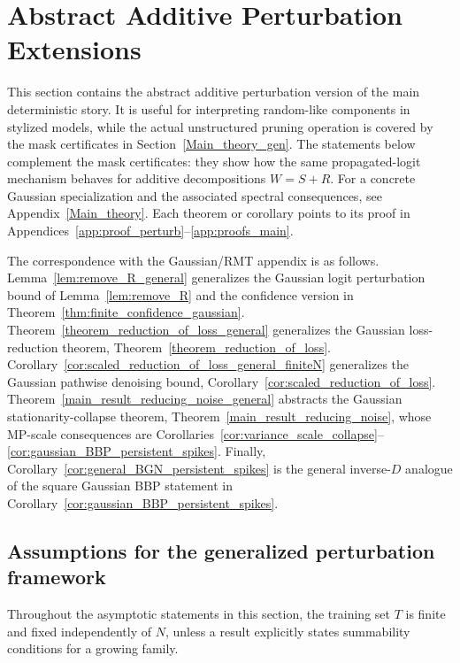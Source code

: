 \documentclass[11pt]{article}
\theoremstyle{plain}
\theoremstyle{definition}
\theoremstyle{remark}
\newcommand{\1}{\mathbf{1}}
\begin{document}
\section{Abstract Additive Perturbation Extensions}
\label{sec:abstract_additive_extensions}

This section contains the abstract additive perturbation version of the main deterministic story.  It is useful for interpreting random-like components in stylized models, while the actual unstructured pruning operation is covered by the mask certificates in Section~\ref{Main_theory_gen}.  The statements below complement the mask certificates: they show how the same propagated-logit mechanism behaves for additive decompositions \(W=S+R\).  For a concrete Gaussian specialization and the associated spectral consequences, see Appendix~\ref{Main_theory}.  Each theorem or corollary points to its proof in Appendices~\ref{app:proof_perturb}--\ref{app:proofs_main}.

The correspondence with the Gaussian/RMT appendix is as follows. Lemma~\ref{lem:remove_R_general} generalizes the Gaussian logit perturbation bound of Lemma~\ref{lem:remove_R} and the confidence version in Theorem~\ref{thm:finite_confidence_gaussian}. Theorem~\ref{theorem_reduction_of_loss_general} generalizes the Gaussian loss-reduction theorem, Theorem~\ref{theorem_reduction_of_loss}. Corollary~\ref{cor:scaled_reduction_of_loss_general_finiteN} generalizes the Gaussian pathwise denoising bound, Corollary~\ref{cor:scaled_reduction_of_loss}. Theorem~\ref{main_result_reducing_noise_general} abstracts the Gaussian stationarity-collapse theorem, Theorem~\ref{main_result_reducing_noise}, whose MP-scale consequences are Corollaries~\ref{cor:variance_scale_collapse}--\ref{cor:gaussian_BBP_persistent_spikes}. Finally, Corollary~\ref{cor:general_BGN_persistent_spikes} is the general inverse-\(D\) analogue of the square Gaussian BBP statement in Corollary~\ref{cor:gaussian_BBP_persistent_spikes}.

\subsection{Assumptions for the generalized perturbation framework}
\label{gen_ass_for_R}

Throughout the asymptotic statements in this section, the training set \(T\) is finite and fixed independently of \(N\), unless a result explicitly states summability conditions for a growing family.
\end{document}

